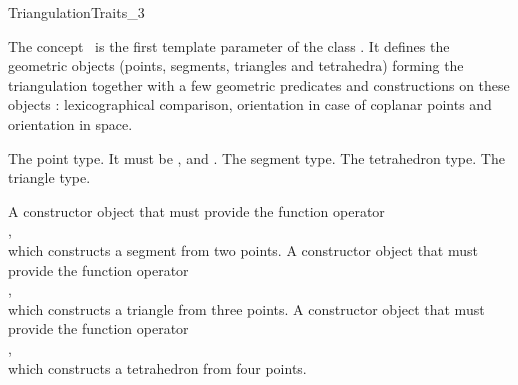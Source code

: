 

\begin{ccRefConcept}{TriangulationTraits_3}

\ccDefinition
The concept \ccRefName\ is the first template parameter of the class
. It defines the geometric objects (points, segments,
triangles and tetrahedra) forming the triangulation together with a few
geometric predicates and constructions on these objects : lexicographical
comparison, orientation in case of coplanar points and orientation in space.

\ccTypes
{}

{The point type.  It must be ,
 and .}
\ccGlue
{} {The segment type.}
\ccGlue
{} {The tetrahedron type.}
\ccGlue
{} {The triangle type.}


{A constructor object that must provide the function operator\\
,\\
which constructs a segment from two points.}
\ccGlue
{}
{A constructor object that must provide the function operator\\
,\\
which constructs a triangle from three points.}
\ccGlue
{}
{A constructor object that must provide the function operator\\
,\\
which constructs a tetrahedron from four points.}


\end{ccRefConcept}
